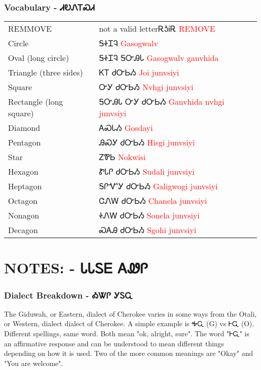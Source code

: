 {{{{{{{{\subsection{Vocabulary - ᏗᎧᏁᎢᏍᏗ 
}
\begin{tabular}{p{3cm} p{11cm}}
REMMOVE & not a valid letterᎡᎼᎥᎡ 
 \newline \textcolor{red}{REMOVE}\\
Circle & ᎦᏐᏆᎸ 
 \newline \textcolor{red}{Gasogwalv}\\
Oval (long circle) & ᎦᏐᏆᎸ ᎦᏅᎯᏓ 
 \newline \textcolor{red}{Gasogwalv ganvhida}\\
Triangle (three sides) & ᏦᎢ ᏧᏅᏏᏱ 
 \newline \textcolor{red}{Joi junvsiyi}\\
Square & ᏅᎩ ᏧᏅᏏᏱ 
 \newline \textcolor{red}{Nvhgi junvsiyi}\\
Rectangle (long square) & ᎦᏅᎯᏓ ᏅᎩ ᏧᏅᏏᏱ 
 \newline \textcolor{red}{Ganvhida nvhgi junvsiyi}\\
Diamond & ᎪᏍᏓᏱ 
 \newline \textcolor{red}{Gosdayi}\\
Pentagon & ᎯᏍᎩ ᏧᏅᏏᏱ 
 \newline \textcolor{red}{Hisgi junvsiyi}\\
Star & ᏃᏈᏏ 
 \newline \textcolor{red}{Nokwisi}\\
Hexagon & ᏑᏓᎵ ᏧᏅᏏᏱ 
 \newline \textcolor{red}{Sudali junvsiyi}\\
Heptagon & ᎦᎵᏉᎩ ᏧᏅᏏᏱ 
 \newline \textcolor{red}{Galigwogi junvsiyi}\\
Octagon & ᏣᏁᎳ ᏧᏅᏏᏱ 
 \newline \textcolor{red}{Chanela junvsiyi}\\
Nonagon & ᏐᏁᎳ ᏧᏅᏏᏱ 
 \newline \textcolor{red}{Sonela junvsiyi}\\
Decagon & ᏍᎪᎯ ᏧᏅᏏᏱ 
 \newline \textcolor{red}{Sgohi junvsiyi}\\
\end{tabular}

\chapter{NOTES: - ᏓᏓᏚᎬ ᎪᏪᎵ 
}
\subsection{Dialect Breakdown - ᎣᏔᎵ  ᎩᏚᏩ}
The Giduwah, or Eastern, dialect of Cherokee varies in some ways from the Otali, or Western, dialect dialect of Cherokee.  A simple example is ᎭᏩ (G) vs ᎰᏩ (O).  Different spellings, same word.  Both mean "ok, alright, sure".  The word "ᎰᏩ" is an affirmative response and can be understood to mean different things depending on how it is used. Two of the more common meanings are "Okay" and "You are welcome".\cite{joynerlesson4}

}}}}}}}}
